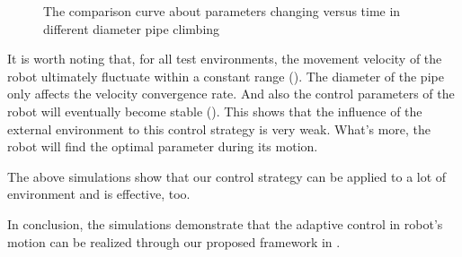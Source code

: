 \begin{figure}[!t]
	\caption{The comparison curve about parameters changing versus time in different diameter pipe climbing}
\end{figure}

It is worth noting that, for all test environments, the movement velocity of the robot ultimately fluctuate within a constant range  (). The diameter of the pipe only affects the velocity convergence rate. And also the control parameters of the robot will eventually become stable (). This shows that the influence of the external environment to this control strategy is very weak. What's more, the robot will find the optimal parameter during its motion.

The above simulations show that our control strategy can be applied to a lot of environment and is effective, too.

In conclusion, the simulations demonstrate that the adaptive control in robot's motion can be realized through our proposed framework in .
